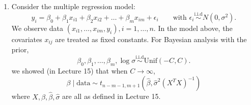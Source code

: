 \documentclass{scrartcl}
\def\qt#1{\qquad\text{#1}}
\begin{document}
\begin{enumerate}
\begin{enumerate}
Interestingly, for the given dataset, the posterior model
probabilities indicate a preference of approximately 3.8 to 1 in favor
of one model over the other. Discuss your thoughts on this
interpretation of the posterior comparison, particularly in relation
to whether such calculations genuinely provide evidence about causal
direction. \textbf{(3 points)}

\end{enumerate}

\item Consider the multiple regression model:
\begin{equation}\label{lm}
  y_i = \beta_0 + \beta_1 x_{i1} + \beta_2 x_{i2} + \dots + \beta_m
  x_{im} + \epsilon_i \qt{with $\epsilon_i
    \overset{\text{i.i.d}}{\sim} N(0, \sigma^2)$}. 
\end{equation}
We observe data $(x_{i1}, \dots, x_{im}, y_i),i = 1, \dots, n$. In the
model above, the covariates $x_{ij}$ are treated as fixed
constants. For Bayesian analysis with the prior, 
  \begin{equation*}
    \beta_0, \beta_1, \dots,\beta_m, \log \sigma
    \overset{\text{i.i.d}}{\sim} 
    \text{Unif}(-C, C). 
  \end{equation*}
we showed (in Lecture 15) that when $C \rightarrow \infty$,
  \begin{equation}\label{inclass}
    \beta \mid \text{data} \sim t_{n-m-1, m+1} \left(\hat{\beta},
      \hat{\sigma}^2 (X^T X)^{-1} \right)
  \end{equation}
  where $X, \beta, \hat{\beta}, \hat{\sigma}$ are all as defined in
  Lecture 15.
  

\end{enumerate}
\end{document}
